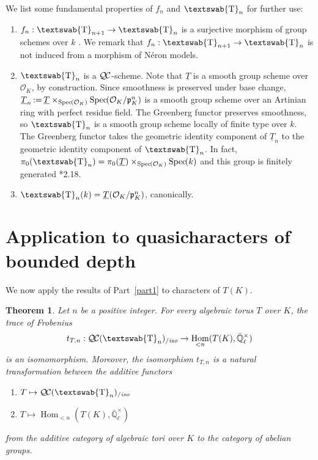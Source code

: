 \documentclass[11pt]{amsart}
\makeatletter
\newcommand{\mathswab}[1]{\operatorname{\textswab{#1}}}
\theoremstyle{plain}
\newtheorem{theorem}{Theorem}[section]
\theoremstyle{definition}
\theoremstyle{remark}
\newcommand{\Spec}[1]{{\operatorname{Spec}\hskip-1pt( #1 )}}
\newcommand{\EE}{\mathbb{\bar Q}_\ell}
\newcommand{\OK}{\mathcal{O}_K}
\newcommand{\pK}{\mathfrak{p}_K}
\newcommand{\Fq}{k}
\newcommand{\EEx}{\EE^\times}
\DeclareMathOperator{\Hom}{Hom}
\newcommand{\ceq}{{\, :=\, }}
\newcommand{\GN}[1]{\mathswab{#1}}
\newcommand{\TT}{\underline{T}}
\newcommand{\QC}{{\mathcal{Q\hskip-0.8pt C}}}
\newcommand{\QCiso}[1]{\QC(#1)_{/\textit{iso}}}
\newcommand{\trFrob}[1]{t_{#1}}
\newcommand{\labitem}[2]{%
\def\@itemlabel{\textbf{#1}}
\item
\def\@currentlabel{#1}\label{#2}}
\makeatother
\begin{document}
We list some fundamental properties of $f_n$ and $\GN{T}_n$ for further use:
 \begin{enumerate}
  \labitem{(GN.0)}{truncation}
  $f_n : \GN{T}_{n+1} \to \GN{T}_n$ is a surjective morphism of group schemes over $\Fq$
  .
  We remark that $f_n : \GN{T}_{n+1} \to \GN{T}_n$ is not induced from a morphism of Néron models.
  \labitem{(GN.1)}{smooth} 
  $\GN{T}_n$ is a $\QC$-scheme. 
  Note that $\underline{T}$ is a smooth group scheme over $\OK$, by construction. 
  Since smoothness is preserved under base change, 
  $\TT_n \ceq \underline{T} \times_\Spec{\OK} \Spec{\OK/\pK^n}$ 
  is a smooth group scheme over an Artinian ring with perfect residue field. 
  The Greenberg functor preserves smoothness, 
  so $\GN{T}_n$ is a smooth group scheme locally of finite type over $\Fq$. 
  The Greenberg functor takes the geometric identity component of $\TT_n$ 
  to the geometric identity component of $\GN{T}_n$.
  In fact, $\pi_0(\GN{T}_n) = \pi_0(\TT) \times_{\Spec{\OK}} \Spec{\Fq}$ and
  this group is finitely generated \cite{xarles:93a}*{2.18}.
  \labitem{(GN.2)}{points} $\GN{T}_n(\Fq) = \TT(\OK/\pK^n)$, canonically.
\end{enumerate}

\section{Application to quasicharacters of bounded depth} \label{sec:bdchar}

We now apply the results of Part~\ref{part1} to characters of $T(K)$.

\begin{theorem}\label{thm:application}
Let $n$ be a positive integer.
For every algebraic torus $T$ over $K$, the trace of Frobenius 
  \[
\trFrob{T,n}:  \QCiso{\GN{T}_n} \to \Hom_{< n}(T(K),\EEx)
  \]
is an isomomorphism. 
Moreover, the isomorphism $\trFrob{T,n}$ is a natural transformation
between the additive functors
\begin{enumerate}
\item[$F_1$:] $T \mapsto \QCiso{\GN{T}_n}$
\item[$F_2$:] $T \mapsto \Hom_{<n}(T(K),\EEx)$
\end{enumerate}
from the additive category of algebraic tori over $K$ to the category of abelian groups.
\end{theorem}
\end{document}
